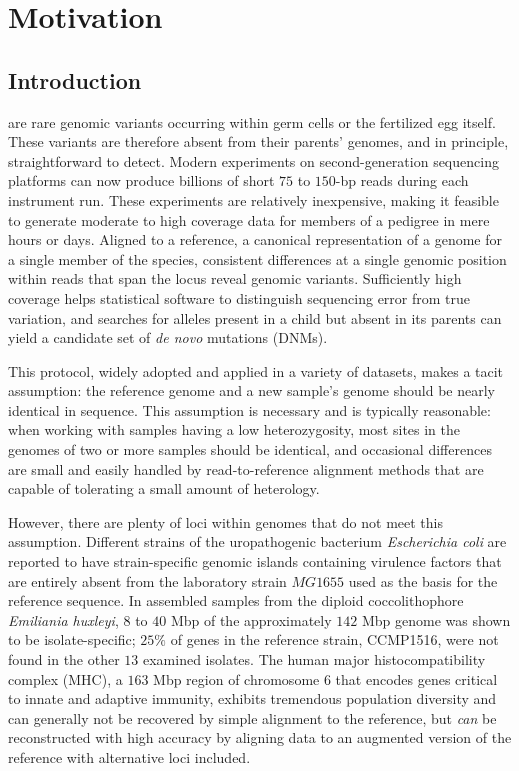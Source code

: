 \chapter{Motivation}
\label{ch:motivation}

\section{Introduction}

 are rare genomic variants occurring within germ cells or the fertilized egg itself.  These variants are therefore absent from their parents' genomes, and in principle, straightforward to detect.  Modern experiments on second-generation sequencing platforms can now produce billions of short $75$ to $150$-bp reads during each instrument run.  These experiments are relatively inexpensive, making it feasible to generate moderate to high coverage data for members of a pedigree in mere hours or days.  Aligned to a reference, a canonical representation of a genome for a single member of the species, consistent differences at a single genomic position within reads that span the locus reveal genomic variants.  Sufficiently high coverage helps statistical software to distinguish sequencing error from true variation, and searches for alleles present in a child but absent in its parents can yield a candidate set of \textit{de novo} mutations (DNMs).

This protocol, widely adopted and applied in a variety of datasets, makes a tacit assumption: the reference genome and a new sample's genome should be nearly identical in sequence.  This assumption is necessary and is typically reasonable: when working with samples having a low heterozygosity, most sites in the genomes of two or more samples should be identical, and occasional differences are small and easily handled by read-to-reference alignment methods that are capable of tolerating a small amount of heterology.

However, there are plenty of loci within genomes that do not meet this assumption.  Different strains of the uropathogenic bacterium \textit{Escherichia coli} are reported to have strain-specific genomic islands containing virulence factors that are entirely absent from the laboratory strain $MG1655$ used as the basis for the reference sequence\cite{Fukiya:2004cn}.  In assembled samples from the diploid coccolithophore \textit{Emiliania huxleyi}, $8$ to $40$ Mbp of the approximately $142$ Mbp genome was shown to be isolate-specific; $25\%$ of genes in the reference strain, CCMP1516, were not found in the other $13$ examined isolates\cite{Read:2013bf}.  The human major histocompatibility complex (MHC), a $163$ Mbp region of chromosome $6$ that encodes genes critical to innate and adaptive immunity\cite{Mungall:2003br,Shiina:2009iy}, exhibits tremendous population diversity\cite{GonzalezGalarza:2014cd} and can generally not be recovered by simple alignment to the reference, but \textit{can} be reconstructed with high accuracy by aligning data to an augmented version of the reference with alternative loci included\cite{Dilthey:2015dq}.

